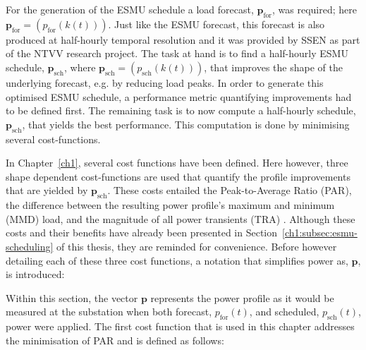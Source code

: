 For the generation of the ESMU schedule a load forecast, $\textbf{p}_\text{for}$, was required; here $\textbf{p}_\text{for} = (p_\text{for}(k(t)))$.
Just like the ESMU forecast, this forecast is also produced at half-hourly temporal resolution and it was provided by SSEN as part of the NTVV research project.
The task at hand is to find a half-hourly ESMU schedule, $\textbf{p}_\text{sch}$, where $\textbf{p}_\text{sch} = (p_\text{sch}(k(t)))$, that improves the shape of the underlying forecast, e.g. by reducing load peaks.
In order to generate this optimised ESMU schedule, a performance metric quantifying improvements had to be defined first.
The remaining task is to now compute a half-hourly schedule, $\textbf{p}_\text{sch}$, that yields the best performance.
This computation is done by minimising several cost-functions.

In Chapter~\ref{ch1}, several cost functions have been defined.
Here however, three shape dependent cost-functions are used that quantify the profile improvements that are yielded by $\textbf{p}_\text{sch}$.
These costs entailed the Peak-to-Average Ratio (PAR), the difference between the resulting power profile's maximum and minimum (MMD) load, and the magnitude of all power transients (TRA) \cite{Mohsenian-Rad2010, Mostafa2016}.
Although these costs and their benefits have already been presented in Section~\ref{ch1:subsec:esmu-scheduling} of this thesis, they are reminded for convenience.
Before however detailing each of these three cost functions, a notation that simplifies power as, $\textbf{p}$, is introduced:



Within this section, the vector $\textbf{p}$ represents the power profile as it would be measured at the substation when both forecast, $p_\text{for}(t)$, and scheduled, $p_\text{sch}(t)$, power were applied.
The first cost function that is used in this chapter addresses the minimisation of PAR and is defined as follows:






